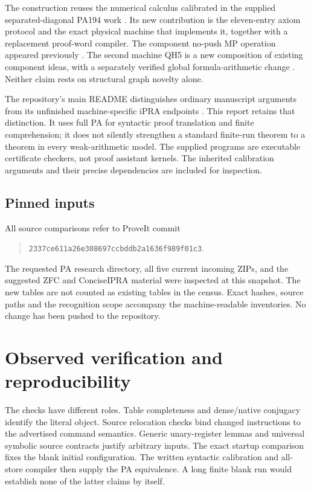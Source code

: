 \documentclass[11pt,letterpaper]{article}
\begin{document}
The construction reuses the numerical calculus calibrated in the supplied
separated-diagonal PA194 work \cite{baseline,pa195}. Its new contribution
is the eleven-entry axiom protocol and the exact physical machine that
implements it, together with a replacement proof-word compiler. The
component no-push MP operation appeared previously \cite{nopush}.
The second machine QH5 is a new composition of existing component ideas,
with a separately verified global formula-arithmetic change \cite{qh6,radix}.
Neither claim rests on structural graph novelty alone.

The repository's main README distinguishes ordinary manuscript arguments
from its unfinished machine-specific iPRA endpoints \cite{paindex}.
This report retains that distinction. It uses full PA for syntactic proof
translation and finite comprehension; it does not silently strengthen a
standard finite-run theorem to a theorem in every weak-arithmetic model.
The supplied programs are executable certificate checkers, not proof
assistant kernels. The inherited calibration arguments and their precise
dependencies are included for inspection.

\subsection{Pinned inputs}

All source comparisons refer to ProveIt commit
\begin{quote}\small\nolinkurl{2337ce611a26e308697ccbddb2a1636f989f01c3}.\end{quote}
The requested PA research directory, all five current incoming ZIPs, and
the suggested ZFC and ConciseIPRA material were inspected at this snapshot.
The new tables are not counted as existing tables in the census.
Exact hashes, source paths and the recognition scope accompany the
machine-readable inventories. No change has been pushed to the repository.




\section{Observed verification and reproducibility}
\label{sec:verification}



The checks have different roles. Table completeness and dense/native
conjugacy identify the literal object. Source relocation checks bind
changed instructions to the advertised command semantics. Generic
unary-register lemmas and universal symbolic source contracts justify
arbitrary inputs. The exact startup comparison fixes the blank initial
configuration. The written syntactic calibration and all-store compiler
then supply the PA equivalence. A long finite blank run would establish
none of the latter claims by itself.
\end{document}
